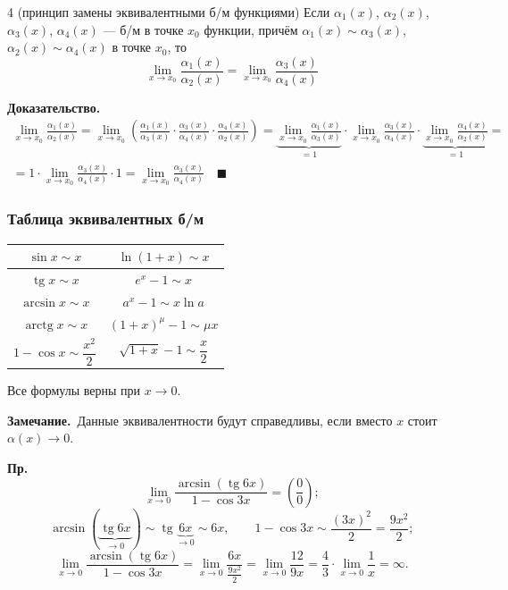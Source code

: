 \documentclass[a4paper,11pt]{article}
\newcommand{\zam}{\textbf{Замечание.}\ }
\newcommand{\dok}{\textbf{Доказательство.}\ }
\begin{document}
\begin{teor}{4 (принцип замены эквивалентными б/м функциями)}
  Если $\alpha_1(x)$, $\alpha_2(x)$, $\alpha_3(x)$, $\alpha_4(x)$ --- б/м в точке $x_0$
  функции, причём $\alpha_1(x) \sim \alpha_3(x)$, $\alpha_2(x) \sim \alpha_4(x)$ в точке
  $x_0$, то
  \[
    \boxed{\lim_{x \to x_0} \frac{\alpha_1(x)}{\alpha_2(x)} = \lim_{x \to x_0} \frac{\alpha_3(x)}{\alpha_4(x)}}
  \]
\end{teor}

\dok
\begin{multline*}
  \lim_{x \to x_0} \frac{\alpha_1(x)}{\alpha_2(x)}
  = \lim_{x \to x_0} \left(\frac{\alpha_1(x)}{\alpha_3(x)} \cdot \frac{\alpha_3(x)}{\alpha_4(x)} \cdot \frac{\alpha_4(x)}{\alpha_2(x)}\right)
  = \underbrace{\lim_{x \to x_0} \frac{\alpha_1(x)}{\alpha_3(x)}}_{=1} \cdot
    \lim_{x \to x_0} \frac{\alpha_3(x)}{\alpha_4(x)} \cdot
    \underbrace{\lim_{x \to x_0} \frac{\alpha_4(x)}{\alpha_2(x)}}_{=1} = \\
  = 1 \cdot \lim_{x \to x_0} \frac{\alpha_3(x)}{\alpha_4(x)} \cdot 1
  = \boxed{\lim_{x \to x_0} \frac{\alpha_3(x)}{\alpha_4(x)}}
\quad\blacksquare
\end{multline*}

\subsubsection{Таблица эквивалентных б/м}

\begin{center}
\renewcommand{\arraystretch}{1.6}
\begin{tabular}{c|c}
  $\sin x \sim x$ & $\ln(1 + x) \sim x$ \\ \hline
  $\operatorname{tg} x \sim x$ & $e^x - 1 \sim x$ \\ \hline
  $\arcsin x \sim x$ & $a^x - 1 \sim x \ln a$ \\ \hline
  $\operatorname{arctg} x \sim x$ & $(1 + x)^\mu - 1 \sim \mu x$ \\ \hline
  $1 - \cos x \sim \dfrac{x^2}{2}$ & $\sqrt{1 + x} - 1 \sim \dfrac{x}{2}$
\end{tabular}
\end{center}

Все формулы верны при $x \to 0$.

\zam Данные эквивалентности будут справедливы, если вместо $x$ стоит
$\alpha(x) \to 0$.

\textbf{Пр.}
\[
  \lim_{x \to 0} \frac{\arcsin(\operatorname{tg} 6x)}{1 - \cos 3x} = \left(\frac{0}{0}\right);
\]
\[
  \arcsin(\underbrace{\operatorname{tg} 6x}_{\to 0}) \sim \operatorname{tg} \underbrace{6x}_{\to 0} \sim 6x,
  \qquad
  1 - \cos 3x \sim \frac{(3x)^2}{2} = \frac{9x^2}{2};
\]
\[
  \lim_{x \to 0} \frac{\arcsin(\operatorname{tg} 6x)}{1 - \cos 3x}
  = \lim_{x \to 0} \frac{6x}{\frac{9x^2}{2}}
  = \lim_{x \to 0} \frac{12}{9x}
  = \frac{4}{3} \cdot \lim_{x \to 0} \frac{1}{x} = \infty.
\]
\end{document}
